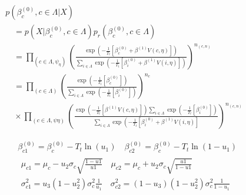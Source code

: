 \documentclass[10pt,letterpaper]{article}
\begin{document}
\begin{equation}
\begin{array}{l}
p\left(\beta_{c}^{(0)}, c \in \Lambda | X\right) \\
\quad=p\left(X | \beta_{c}^{(0)}, c \in \Lambda\right) p_{r}\left(\beta_{c}^{(0)}, c \in \Lambda\right) \\
\quad=\prod_{\left(c \in \Lambda, \psi_{\eta}\right)}\left(\frac{\exp \left(-\frac{1}{T_{t}}\left[\beta_{c}^{(0)}+\beta^{(1)} V(c, \eta)\right]\right)}{\sum_{i \in \Lambda} \exp \left(-\frac{1}{T_{t}}\left[\beta_{i}^{(0)}+\beta^{(1)} V(i, \eta)\right]\right)}\right)^{n_{(c, n)}} \\
\quad=\prod_{(c \in \Lambda)}\left(\frac{\exp \left(-\frac{1}{T_{t}}\left[\beta_{c}^{(0)}\right]\right)}{\sum_{i \in \Lambda} \exp \left(-\frac{1}{T_{t}}\left[\beta_{i}^{(0)}\right]\right)}\right)^{n_{c}} \\
\quad \times \prod_{(c \in \Lambda, \psi \eta)}\left(\frac{\exp \left(-\frac{1}{T_{t}}\left[\beta^{(1)} V(c, \eta)\right]\right) \sum_{i \in \Lambda} \exp \left(-\frac{1}{T_{t}}\left[\beta_{i}^{(0)}\right]\right)}{\sum_{i \in \Lambda} \exp \left(-\frac{1}{T_{t}}\left[\beta_{i}^{(0)}+\beta^{(1)} V(i, \eta)\right]\right.}\right)^{n_{(c, n)}}
\end{array}
\end{equation}


\begin{equation}
\begin{aligned}
&\beta_{c 1}^{(0)}=\beta_{c}^{(0)}-T_{t} \ln \left(u_{1}\right) \quad \beta_{c 2}^{(0)}=\beta_{c}^{(0)}-T_{t} \ln \left(1-u_{1}\right)\\
&\begin{array}{l}
\mu_{c 1}=\mu_{c}-u_{2} \sigma_{c} \sqrt{\frac{1-u 1}{u 1}} \quad \mu_{c 2}=\mu_{c}+u_{2} \sigma_{c} \sqrt{\frac{u 1}{1-u 1}} \\
\sigma_{c 1}^{2}=u_{3}\left(1-u_{2}^{2}\right) \sigma_{c}^{2} \frac{1}{u_{1}} \quad \sigma_{c 2}^{2}=\left(1-u_{3}\right)\left(1-u_{2}^{2}\right) \sigma_{c}^{2} \frac{1}{1-u_{1}}
\end{array}
\end{aligned}
\end{equation}
\end{document}
